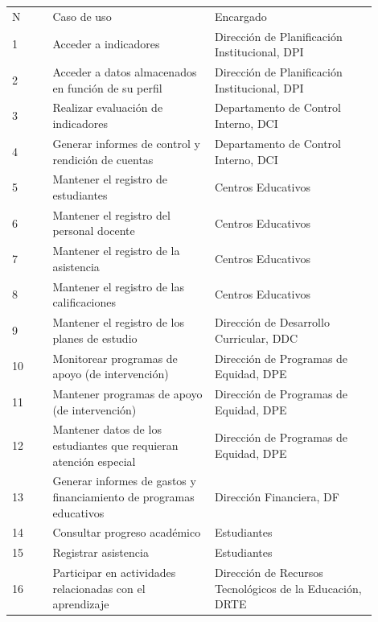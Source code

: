 \documentclass{article}
\begin{document}
\begin{multicols}{6}[]
\begin{center}
	\label{squ:workers}
	\begin{tabular}{p{0.1\linewidth}p{0.4\linewidth}p{0.4\linewidth}}
		\rowcolor{gray!40}
		N & Caso de uso & Encargado \\
		1 & Acceder a indicadores & Direcci\'on de Planificaci\'on Institucional, DPI \\
		2 & Acceder a datos almacenados en funci\'on de su perfil & Direcci\'on de Planificaci\'on Institucional, DPI \\
		3 & Realizar evaluaci\'on de indicadores & Departamento de Control Interno, DCI \\
		4 & Generar informes de control y rendici\'on de cuentas & Departamento de Control Interno, DCI \\
		5 & Mantener el registro de estudiantes & Centros Educativos \\
		6 & Mantener el registro del personal docente & Centros Educativos \\
		7 & Mantener el registro de la asistencia & Centros Educativos \\
		8 & Mantener el registro de las calificaciones & Centros Educativos \\
		9 & Mantener el registro de los planes de estudio & Direcci\'on de Desarrollo Curricular, DDC \\
		10 & Monitorear programas de apoyo (de intervenci\'on) & Direcci\'on de Programas de Equidad, DPE \\
		11 & Mantener programas de apoyo (de intervenci\'on) & Direcci\'on de Programas de Equidad, DPE \\
		12 & Mantener datos de los estudiantes que requieran atenci\'on especial & Direcci\'on de Programas de Equidad, DPE \\
		13 & Generar informes de gastos y financiamiento de programas educativos & Direcci\'on Financiera, DF \\
		14 & Consultar progreso acad\'emico & Estudiantes \\
		15 & Registrar asistencia & Estudiantes \\
		16 & Participar en actividades relacionadas con el aprendizaje & Direcci\'on de Recursos Tecnol\'ogicos de la Educaci\'on, DRTE \\

\end{tabular}
\end{center}
\end{multicols}
\end{document}
